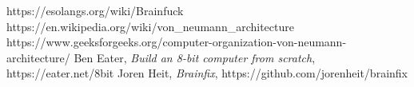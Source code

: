 \begin{thebibliography}{99}
 https://esolangs.org/wiki/Brainfuck
 https://en.wikipedia.org/wiki/von\_neumann\_architecture
 https://www.geeksforgeeks.org/computer-organization-von-neumann-architecture/
 Ben Eater, \emph{Build an 8-bit computer from scratch}, https://eater.net/8bit
 Joren Heit, \emph{Brainfix}, https://github.com/jorenheit/brainfix
\end{thebibliography}
